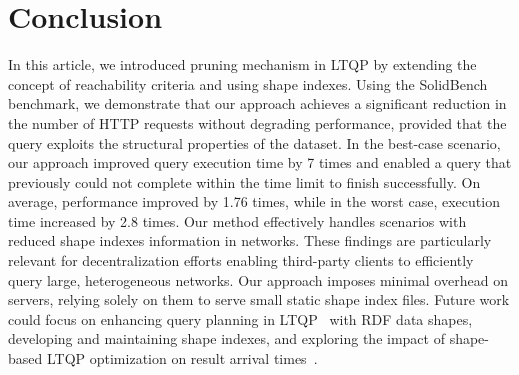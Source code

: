 \section{Conclusion}\label{sec:conclusion}

In this article, we introduced pruning mechanism in LTQP by extending the concept of reachability criteria and using shape indexes.
Using the SolidBench benchmark, we demonstrate that our approach achieves a significant reduction in the number of HTTP requests without degrading performance, provided that the query exploits the structural properties of the dataset.
In the best-case scenario, our approach improved query execution time by 7 times and enabled a query that previously could not complete within the time limit to finish successfully.
On average, performance improved by 1.76 times, while in the worst case, execution time increased by 2.8 times.
Our method effectively handles scenarios with reduced shape indexes information in networks.
These findings are particularly relevant for decentralization efforts enabling third-party clients to efficiently query large, heterogeneous networks.
Our approach imposes minimal overhead on servers, relying solely on them to serve small static shape index files.
Future work could focus on enhancing query planning in LTQP~\cite{taelman2024towards} with RDF data shapes, developing and maintaining shape indexes, and exploring the impact of shape-based LTQP optimization on result arrival times~\cite{Acosta2017}.

